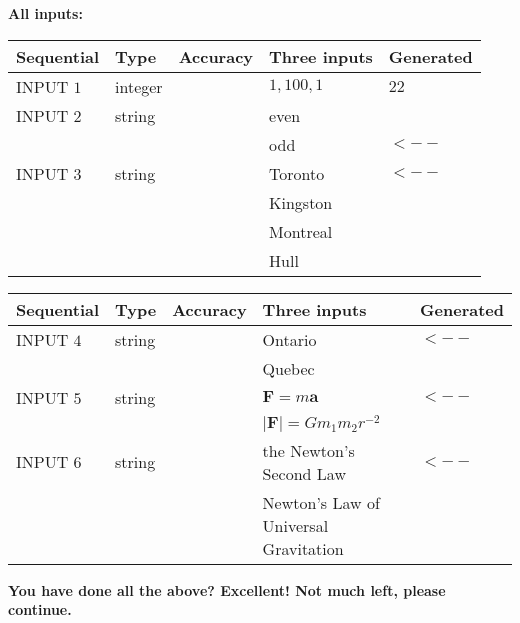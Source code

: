 \documentclass[12pt]{article}
\begin{document}
   
   
   
\noindent\vspace{0.1in}\hspace{-0.08in} {\textbf{\Large{All inputs: }}}
   
   
  
  
\noindent\begin{tabular}{|l|l|l|l|l|}
\hline
 Sequential & Type & Accuracy & Three inputs & Generated \\ 
\hline
 
 
  INPUT $            1 $ & integer &  & $
 1
 , 
 100
 , 
 1
 $ & $ 22 $ 
 \\  \hline  
 
 
  INPUT $            2 $ & string & & 
 even & 
  \\
  & & & 
 odd & 
  $ <-- $ 
 \\  \hline  
 
 
  INPUT $            3 $ & string & & 
 Toronto & 
  $ <-- $ 
  \\
  & & & 
 Kingston & 
  \\
  & & & 
 Montreal & 
  \\
  & & & 
 Hull & 
 \\  \hline  
 \end{tabular}
   
   
  
  
\noindent\begin{tabular}{|l|l|l|l|l|}
\hline
 Sequential & Type & Accuracy & Three inputs & Generated \\ 
\hline
 
 
  INPUT $            4 $ & string & & 
 Ontario & 
  $ <-- $ 
  \\
  & & & 
 Quebec & 
 \\  \hline  
 
 
  INPUT $            5 $ & string & & 
 $\mathbf{F}=m\mathbf{a}$ & 
  $ <-- $ 
  \\
  & & & 
 $\left| \mathbf{F}\right| =Gm_1m_2r^{-2}$ & 
 \\  \hline  
 
 
  INPUT $            6 $ & string & & 
 the Newton's Second Law & 
  $ <-- $ 
  \\
  & & & 
 Newton's Law of Universal Gravitation & 
 \\  \hline  
 \end{tabular}
   
   
   
   
\vspace{0.3in}
{\textbf{\LARGE{You have done all the above? Excellent! Not much left, please continue.}}}
\vspace{0.3in}
   
\end{document}
